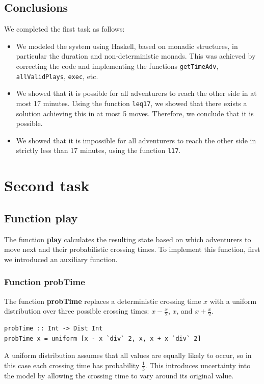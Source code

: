 \documentclass[a4paper,12pt]{report}
\begin{document}
\section{Conclusions}
We completed the first task as follows:
\begin{itemize}
    \item We modeled the system using Haskell, based on monadic structures, in particular the duration and non-deterministic monads. This was achieved by correcting the code and implementing the functions \texttt{getTimeAdv}, \texttt{allValidPlays}, \texttt{exec}, etc.
    \item We showed that it is possible for all adventurers to reach the other side in at most 17 minutes. Using the function \texttt{leq17}, we showed that there exists a solution achieving this in at most 5 moves. Therefore, we conclude that it is possible.
    \item We showed that it is impossible for all adventurers to reach the other side in strictly less than 17 minutes, using the function \texttt{l17}.
\end{itemize}
\chapter{Second task}
\section{Function play}
The function \textbf{play} calculates the resulting state based on which
adventurers to move next and their probabilistic crossing times. To implement this function, first we introduced an auxiliary function.
\subsection{Function probTime}
The function \textbf{probTime} replaces a deterministic crossing time $x$
with a uniform distribution over three possible crossing times:
$x - \frac{x}{2}$, $x$, and $x + \frac{x}{2}$.
\begin{verbatim}
probTime :: Int -> Dist Int
probTime x = uniform [x - x `div` 2, x, x + x `div` 2]
\end{verbatim}
A uniform distribution assumes that all values are equally likely to occur,
so in this case each crossing time has probability $\frac{1}{3}$.
This introduces uncertainty into the model by allowing the crossing
time to vary around its original value.
\end{document}
